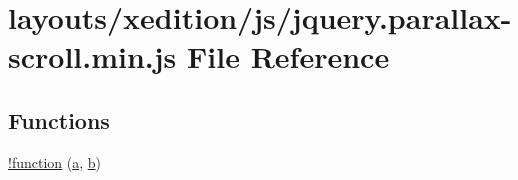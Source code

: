 \hypertarget{jquery_8parallax-scroll_8min_8js}{}\section{layouts/xedition/js/jquery.parallax-\/scroll.min.\+js File Reference}
\label{jquery_8parallax-scroll_8min_8js}
\subsection*{Functions}
\begin{DoxyCompactItemize}
\item 
\hyperlink{jquery_8parallax-scroll_8min_8js_a43f0b96ea8ec44ca20ba86809a785614}{!function} (\hyperlink{jqplot_8barRenderer_8min_8js_a15f14caa0c9de3a415d8eb9d88378fc0}{a}, \hyperlink{jqplot_8barRenderer_8min_8js_a2fc619a5cd76c0e5c2bd9f57a6fcbd3e}{b})
\end{DoxyCompactItemize}
